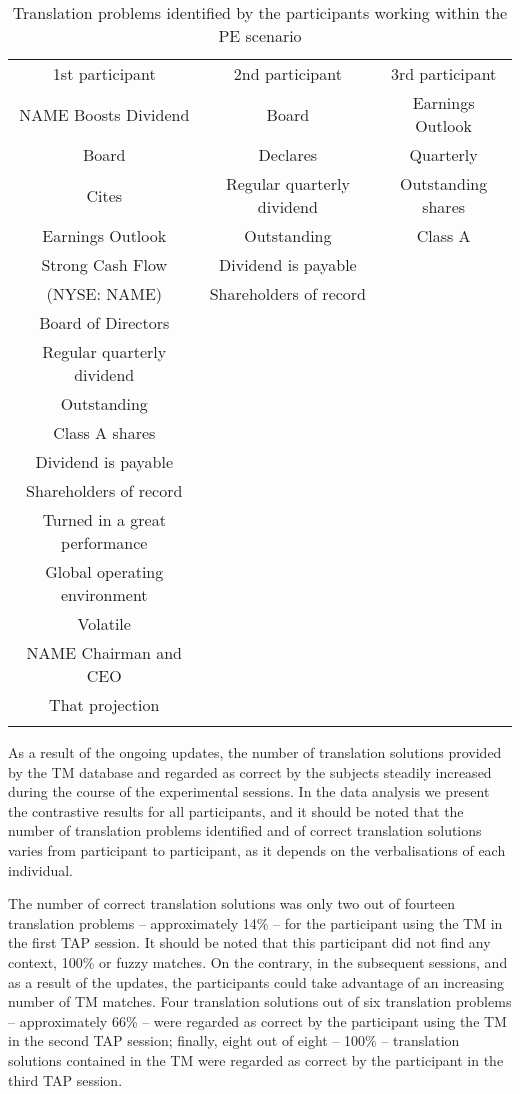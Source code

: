 \documentclass[output=paper]{LSP/langsci}
\begin{document}
\begin{table}
\small
\caption{Translation problems identified by the participants working within the PE scenario}
\label{rossetti-gaspari:tab:2}
\begin{tabularx}{\textwidth}{ccc}
\lsptoprule
\multicolumn{3}{c}{Translation problems in the PE scenario}\\
\midrule
 1st participant & 2nd participant & 3rd participant\\
\midrule
  NAME Boosts Dividend &  Board &  Earnings Outlook\\
  Board &  Declares &  Quarterly\\
  Cites &  Regular quarterly dividend &  Outstanding shares\\
  Earnings Outlook &  Outstanding &  Class A\\
  Strong Cash Flow &  Dividend is payable & \\
  (NYSE: NAME) &  Shareholders of record & \\
  Board of Directors &  & \\
  Regular quarterly dividend &  & \\
  Outstanding &  & \\
  Class A shares &  & \\
  Dividend is payable &  & \\
  Shareholders of record &  & \\
  Turned in a great performance &  & \\
  Global operating environment &  & \\
  Volatile &  & \\
  NAME Chairman and CEO &  & \\
  That projection &  & \\
\lspbottomrule
\end{tabularx}
\end{table}

As a result of the ongoing updates, the number of translation solutions provided by the TM database and regarded as correct by the subjects steadily increased during the course of the experimental sessions. In the data analysis we present the contrastive results for all participants, and it should be noted that the number of translation problems identified and of correct translation solutions varies from participant to participant, as it depends on the verbalisations of each individual.


The number of correct translation solutions was only two out of fourteen translation problems -- approximately 14\% -- for the participant using the TM in the first TAP session. It should be noted that this participant did not find any context, 100\% or fuzzy matches. On the contrary, in the subsequent sessions, and as a result of the updates, the participants could take advantage of an increasing number of TM matches. Four translation solutions out of six translation problems -- approximately 66\% -- were regarded as correct by the participant using the TM in the second TAP session; finally, eight out of eight -- 100\% -- translation solutions contained in the TM were regarded as correct by the participant in the third TAP session.
\end{document}
